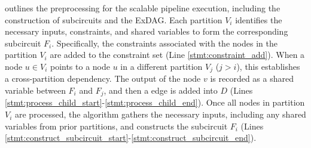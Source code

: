  outlines the preprocessing for the scalable pipeline execution, including the construction of subcircuits and the ExDAG. Each partition  $V_i$ identifies the necessary inputs, constraints, and shared variables to form the corresponding subcircuit $F_i$. Specifically, the constraints associated with the nodes in the partition $V_i$ are added to the constraint set (Line \ref{stmt:constraint_add}). When a node $u\in V_i$ points to a node $u$ in a different partition $V_j$ ($j > i$), this establishes a cross-partition dependency. The output of the node $v$ is recorded as a shared variable between $F_i$ and $F_j$, and then a edge is added into $D$
(Lines \ref{stmt:process_child_start}-\ref{stmt:process_child_end}). Once all nodes in partition $V_i$ are processed, the algorithm gathers the necessary inputs, including any shared variables from prior partitions, and constructs the subcircuit $F_i$ (Lines \ref{stmt:construct_subcircuit_start}-\ref{stmt:construct_subcircuit_end}).




